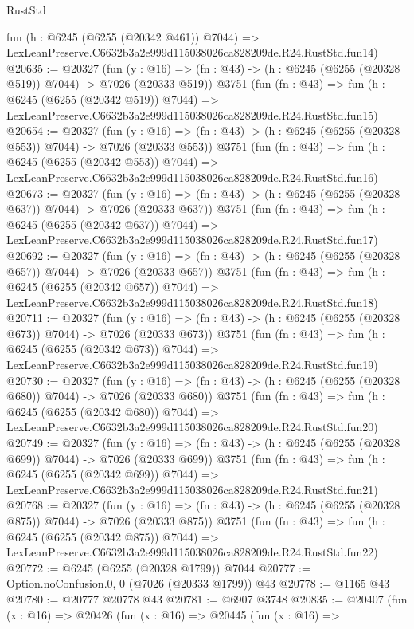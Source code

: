 \begin{lexlean}{RustStd}
\begin{coremodule}
    fun (h : @6245 (@6255 (@20342 @461)) @7044) =>
    LexLeanPreserve.C6632b3a2e999d115038026ca828209de.R24.RustStd.fun14)
@20635 := @20327
    (fun (y : @16) => (fn : @43) -> (h : @6245 (@6255 (@20328 @519)) @7044) -> @7026 (@20333 @519))
    @3751
    (fun (fn : @43) =>
    fun (h : @6245 (@6255 (@20342 @519)) @7044) =>
    LexLeanPreserve.C6632b3a2e999d115038026ca828209de.R24.RustStd.fun15)
@20654 := @20327
    (fun (y : @16) => (fn : @43) -> (h : @6245 (@6255 (@20328 @553)) @7044) -> @7026 (@20333 @553))
    @3751
    (fun (fn : @43) =>
    fun (h : @6245 (@6255 (@20342 @553)) @7044) =>
    LexLeanPreserve.C6632b3a2e999d115038026ca828209de.R24.RustStd.fun16)
@20673 := @20327
    (fun (y : @16) => (fn : @43) -> (h : @6245 (@6255 (@20328 @637)) @7044) -> @7026 (@20333 @637))
    @3751
    (fun (fn : @43) =>
    fun (h : @6245 (@6255 (@20342 @637)) @7044) =>
    LexLeanPreserve.C6632b3a2e999d115038026ca828209de.R24.RustStd.fun17)
@20692 := @20327
    (fun (y : @16) => (fn : @43) -> (h : @6245 (@6255 (@20328 @657)) @7044) -> @7026 (@20333 @657))
    @3751
    (fun (fn : @43) =>
    fun (h : @6245 (@6255 (@20342 @657)) @7044) =>
    LexLeanPreserve.C6632b3a2e999d115038026ca828209de.R24.RustStd.fun18)
@20711 := @20327
    (fun (y : @16) => (fn : @43) -> (h : @6245 (@6255 (@20328 @673)) @7044) -> @7026 (@20333 @673))
    @3751
    (fun (fn : @43) =>
    fun (h : @6245 (@6255 (@20342 @673)) @7044) =>
    LexLeanPreserve.C6632b3a2e999d115038026ca828209de.R24.RustStd.fun19)
@20730 := @20327
    (fun (y : @16) => (fn : @43) -> (h : @6245 (@6255 (@20328 @680)) @7044) -> @7026 (@20333 @680))
    @3751
    (fun (fn : @43) =>
    fun (h : @6245 (@6255 (@20342 @680)) @7044) =>
    LexLeanPreserve.C6632b3a2e999d115038026ca828209de.R24.RustStd.fun20)
@20749 := @20327
    (fun (y : @16) => (fn : @43) -> (h : @6245 (@6255 (@20328 @699)) @7044) -> @7026 (@20333 @699))
    @3751
    (fun (fn : @43) =>
    fun (h : @6245 (@6255 (@20342 @699)) @7044) =>
    LexLeanPreserve.C6632b3a2e999d115038026ca828209de.R24.RustStd.fun21)
@20768 := @20327
    (fun (y : @16) => (fn : @43) -> (h : @6245 (@6255 (@20328 @875)) @7044) -> @7026 (@20333 @875))
    @3751
    (fun (fn : @43) =>
    fun (h : @6245 (@6255 (@20342 @875)) @7044) =>
    LexLeanPreserve.C6632b3a2e999d115038026ca828209de.R24.RustStd.fun22)
@20772 := @6245 (@6255 (@20328 @1799)) @7044
@20777 := Option.noConfusion.{0, 0} (@7026 (@20333 @1799)) @43
@20778 := @1165 @43
@20780 := @20777 @20778 @43
@20781 := @6907 @3748
@20835 := @20407
    (fun (x : @16) =>
    @20426
      (fun (x : @16) =>
      @20445
        (fun (x : @16) =>

\end{coremodule}
\end{lexlean}
